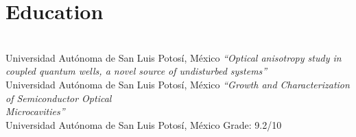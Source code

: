 \documentclass[letterpaper]{twentysecondcv} %
\begin{document}

\aboutme{} %







\makeprofile %



\section{Education}

\begin{twenty} %
	                       {\\Universidad Aut\'onoma de San Luis Potos\'i, M\'exico}
	                       {\emph{``Optical anisotropy study in coupled quantum wells, a novel source of undisturbed systems''}}
	                      {\\Universidad Aut\'onoma de San Luis Potos\'i, M\'exico}
	                      {\emph{``Growth and Characterization of Semiconductor Optical \\ Microcavities''}}
	                      {\\Universidad Aut\'onoma de San Luis Potos\'i, M\'exico}
	                      {Grade: 9.2/10}
	
\end{twenty}
\end{document}
